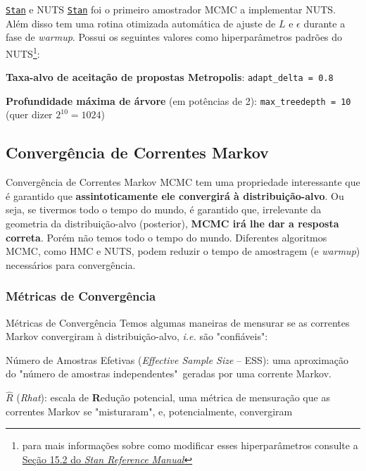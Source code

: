 \begin{frame}{\href{https://mc-stan.org}{\texttt{Stan}} e NUTS}
  \href{https://mc-stan.org}{\texttt{Stan}} foi o primeiro amostrador MCMC a
  implementar NUTS. Além disso tem uma rotina otimizada automática de ajuste de $L$
  e $\epsilon$ durante a fase de \textit{warmup}. Possui os seguintes valores como
  hiperparâmetros padrões do NUTS\footnote{para mais informações sobre como
  modificar esses hiperparâmetros consulte a \href{
    https://mc-stan.org/docs/reference-manual/hmc-algorithm-parameters.html}{
    Seção 15.2 do \textit{Stan Reference Manual}}}:
  \begin{vfilleditems}
    \item \textbf{Taxa-alvo de aceitação de propostas Metropolis}: \lstinline!adapt_delta = 0.8!
    \item \textbf{Profundidade máxima de árvore} (em potências de 2): \lstinline!max_treedepth = 10! (quer dizer $2^{10} = 1024$)
  \end{vfilleditems}
\end{frame}

\subsection{Convergência de Correntes Markov}
\begin{frame}{Convergência de Correntes Markov}
  MCMC tem uma propriedade interessante que é garantido que \textbf{assintoticamente ele convergirá
  à distribuição-alvo}.
  \vfill
  Ou seja, se tivermos todo o tempo do mundo, é garantido que, irrelevante da geometria
  da distribuição-alvo (posterior), \textbf{MCMC irá lhe dar a resposta correta}.
  \vfill
  Porém não temos todo o tempo do mundo. Diferentes algoritmos MCMC, como HMC e NUTS,
  podem reduzir o tempo de amostragem (e \textit{warmup}) necessários para convergência.
\end{frame}

\subsubsection{Métricas de Convergência}
\begin{frame}{Métricas de Convergência}
  Temos algumas maneiras de mensurar se as correntes Markov convergiram à distribuição-alvo,
  \textit{i.e.} são "confiáveis":
  \begin{vfilleditems}
    \item Número de Amostras Efetivas (\textit{Effective Sample Size} -- ESS):
    uma aproximação do "número de amostras independentes"~geradas por uma corrente Markov.
    \item $\widehat{R}$ (\textit{Rhat}):
    escala de \textbf{R}edução potencial, uma métrica de mensuração que as correntes
    Markov se "misturaram", e, potencialmente, convergiram
  \end{vfilleditems}
\end{frame}

